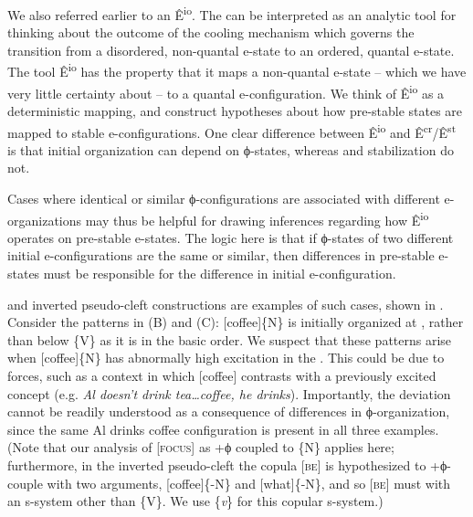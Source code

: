   We also referred earlier to an  Ê\textsuperscript{io}. The  can be interpreted as an analytic tool for thinking about the outcome of the cooling mechanism which governs the transition from a disordered, non-quantal e-state to an ordered, quantal e-state. The tool Ê\textsuperscript{io} has the property that it maps a non-quantal e-state -- which we have very little certainty about -- to a quantal e-con\-fig\-u\-ra\-tion. We think of Ê\textsuperscript{io} as a deterministic mapping, and construct hypotheses about how pre-stable states are mapped to stable e-con\-fig\-u\-ra\-tions. One clear difference between Ê\textsuperscript{io} and Ê\textsuperscript{cr}/Ê\textsuperscript{st} is that initial organization can depend on ϕ-states, whereas  and stabilization do not. 

  Cases where identical or similar ϕ-con\-fig\-u\-ra\-tions are associated with different e-organizations may thus be helpful for drawing inferences regarding how Ê\textsuperscript{io} operates on pre-stable e-states. The logic here is that if ϕ-states of two different initial e-con\-fig\-u\-ra\-tions are the same or similar, then differences in pre-stable e-states must be responsible for the difference in initial e-con\-fig\-u\-ra\-tion. 

   and inverted pseudo-cleft constructions are examples of such cases, shown in {}. Consider the patterns in (B) and (C): [coffee]\{N\} is initially organized at , rather than below \{V\} as it is in the basic order. We suspect that these patterns arise when [coffee]\{N\} has abnormally high excitation in the . This could be due to  forces, such as a context in which [coffee] contrasts with a previously excited concept (e.g. \textit{Al doesn't drink tea…coffee, he drinks}). Importantly, the deviation cannot be readily understood as a consequence of differences in ϕ-organization, since the same {\textbar}Al drinks coffee{\textbar} configuration is present in all three examples. (Note that our analysis of [\textsc{focus}] as +ϕ coupled to \{N\} applies here; furthermore, in the inverted pseudo-cleft the copula [\textsc{be}] is hypothesized to +ϕ-couple with two arguments, [coffee]\{-N\} and [what]\{-N\}, and so [\textsc{be}] must  with an s-system other than \{V\}. We use \{\textit{v}\} for this copular s-system.)

